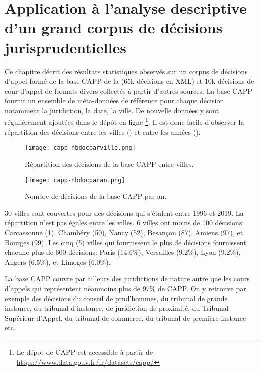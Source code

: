 \chapter[Application à l'analyse descriptive d'un grand corpus]{Application à l'analyse descriptive d'un grand corpus de décisions jurisprudentielles}
\label{chap:demo}
Ce chapitre décrit des résultats statistiques observés sur un corpus de décisions d'appel formé de la base CAPP de la \citet{dila2019capp} (65k décisions en XML) et 10k décisions de cour d'appel de formats divers collectés à partir d'autres sources. La base CAPP fournit un ensemble de méta-données de référence pour chaque décision notamment la juridiction, la date, la ville. De nouvelle données y sont régulièrement ajoutées dans le dépôt en ligne \footnote{Le dépot de CAPP est accessible à partir de \url{https://www.data.gouv.fr/fr/datasets/capp/}}. Il est donc facile d'observer la répartition des décisions entre les villes () et entre les années ().

\begin{figure}[!htb]
	\centering
	\centering
	\texttt{[image: capp-nbdocparville.png]}
	\caption{Répartition des décisions de la base CAPP entre villes.} \label{fig:demo:doc-per-city}
\end{figure}

\begin{figure}[!htb]
	\centering
	\texttt{[image: capp-nbdocparan.png]}
	\caption{Nombre de décisions de la base CAPP par an.} \label{fig:demo:doc-per-year}
\end{figure}

 30 villes sont couvertes pour des décisions qui s'étalent entre 1996 et 2019. La répartition n'est pas égales entre les villes.  6 villes ont moins de 100 décisions: Carcassonne (1), Chambéry (50), Nancy (52), Besançon (87), Amiens (97), et Bourges (99). Les cinq (5) villes qui fournissent le plus de décisions fournissent chacune plus de 600 décisions: Paris (14.6\%), Versailles (9.2\%), Lyon (9.2\%), Angers (6.5\%), et Limoges (6.0\%).



La base CAPP couvre par ailleurs des juridictions de nature autre que les cours d'appels qui représentent néanmoins plus de 97\% de CAPP. On y retrouve par exemple des décisions du conseil de prud'hommes, du tribunal de grande instance, du tribunal d'instance, de juridiction de proximité, du Tribunal Supérieur d'Appel, du tribunal de commerce, du tribunal de première instance etc.


